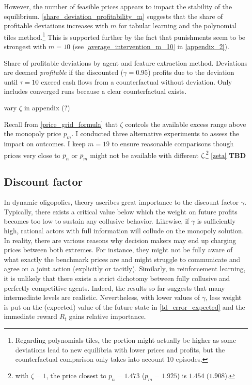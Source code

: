 However, the number of feasible prices appears to impact the stability of the equilibrium. \autoref{share_deviation_profitability_m} suggests that the share of profitable deviations increases with $m$ for tabular learning and the polynomial tiles method.\footnote{Regarding polynomials tiles, the portion might actually be higher as some deviations lead to new equilibria with lower prices and profits, but the counterfactual comparison only takes into account 10 episodes.} This is supported further by the fact that punishments seem to be strongest with $m = 10$ (see \autoref{average_intervention_m_10} in \autoref{appendix_2}).

\begin{center}
	\begin{table}
		
		\caption{Share of profitable deviations by agent and feature extraction method. Deviations are deemed \emph{profitable} if the discounted ($\gamma = 0.95$) profits due to the deviation until $\tau = 10$  exceed cash flows from a counterfactual without deviation. Only includes converged runs because a clear counterfactual exists.}
		\label{share_deviation_profitability_m}
	\end{table}
\end{center}



vary $\zeta$ in appendix (?)

Recall from \autoref{price_grid_formula} that $\zeta$ controls the available excess range above the monopoly price $p_m$. I conducted three alternative experiments to assess the impact on outcomes. I keep $m=19$ to ensure reasonable comparisons though prices very close to $p_n$ or $p_m$ might not be available with different $\zeta$.\footnote{with $\zeta = 1$, the price closest to $p_n = 1.473$ ($p_m = 1.925$) is $1.454$ ($1.908$).} \autoref{zeta} \textbf{TBD}
 

\subsection{Discount factor}

In dynamic oligopolies, theory ascribes great importance to the discount factor $\gamma$. Typically, there exists a critical value below which the weight on future profits becomes too low to sustain any collusive behavior. Likewise, if $\gamma$ is sufficiently high, rational actors with full information will collude on the monopoly solution. In reality, there are various reasons why decision makers may end up charging prices between both extremes. For instance, they might not be fully aware of what exactly the benchmark prices are and might struggle to communicate and agree on a joint action (explicitly or tacitly). Similarly, in reinforcement learning, it is unlikely that there exists a strict dichotomy between fully collusive and perfectly competitive agents. Indeed, the results so far suggests that many intermediate levels are realistic. Nevertheless, with lower values of $\gamma$, less weight is put on the (expected) value of the future state in \autoref{td_error_expected} and the immediate reward $R_t$ gains relative importance.

